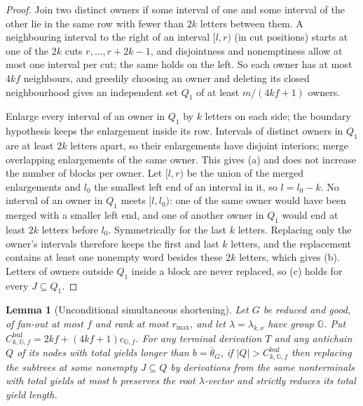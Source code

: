 \documentclass[11pt]{article}
\numberwithin{equation}{section}
\theoremstyle{plain}
\newtheorem{lemma}[theorem]{Lemma}
\theoremstyle{definition}
\theoremstyle{remark}
\theoremstyle{plain}
\begin{document}
\begin{proof}
Join two distinct owners if some interval of one and some interval of the
other lie in the same row with fewer than $2k$ letters between them.  A
neighbouring interval to the right of an interval $[l,r)$ (in cut positions)
starts at one of the $2k$ cuts $r,\ldots,r+2k-1$, and disjointness and
nonemptiness allow at most one interval per cut; the same holds on the left.
So each owner has at most $4kf$ neighbours, and greedily choosing an owner and
deleting its closed neighbourhood gives an independent set $Q_1$ of at least
$m/(4kf+1)$ owners.

Enlarge every interval of an owner in $Q_1$ by $k$ letters on each side; the
boundary hypothesis keeps the enlargement inside its row.  Intervals of
distinct owners in $Q_1$ are at least $2k$ letters apart, so their enlargements
have disjoint interiors; merge overlapping enlargements of the same owner.
This gives (a) and does not increase the number of blocks per owner.  Let
$[l,r)$ be the union of the merged enlargements and $l_0$ the smallest left end
of an interval in it, so $l=l_0-k$.  No interval of an owner in $Q_1$ meets
$[l,l_0)$: one of the same owner would have been merged with a smaller left
end, and one of another owner in $Q_1$ would end at least $2k$ letters before
$l_0$.  Symmetrically for the last $k$ letters.  Replacing only the owner's
intervals therefore keeps the first and last $k$ letters, and the replacement
contains at least one nonempty word besides these $2k$ letters, which gives
(b).  Letters of owners outside $Q_1$ inside a block are never replaced, so
(c) holds for every $J\subseteq Q_1$.
\end{proof}

\begin{lemma}[Unconditional simultaneous shortening]
\label{lem:lg-unconditional-shortening}
Let $G$ be reduced and good, of fan-out at most $f$ and rank at most
$r_{\max}$, and let $\lambda=\lambda_{k,\nu}$ have group $\mathbb G$.
Put $C^{\mathrm{buf}}_{k,\mathbb G,f}=2kf+(4kf+1)c_{\mathbb G,f}$.
For any terminal derivation $T$ and any antichain $Q$ of its nodes
with total yields longer than $b=\bar\theta_G$, if
$|Q|>C^{\mathrm{buf}}_{k,\mathbb G,f}$ then replacing the subtrees
at some nonempty $J\subseteq Q$ by derivations from the same
nonterminals with total yields at most $b$ preserves the root
$\lambda$-vector and strictly reduces its total yield length.
\end{lemma}
\end{document}
